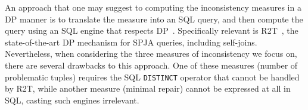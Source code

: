 


An approach that one may suggest to computing the inconsistency measures in a DP manner is to translate the measure into an SQL query, and then compute the query using an SQL engine that respects DP~\cite{tao2020computing,dong2022r2t,kotsogiannis2019privatesql,johnson2018towards}. Specifically relevant is R2T~\cite{dong2022r2t}, the state-of-the-art DP mechanism for SPJA queries, including self-joins. Nevertheless, when considering the three measures of inconsistency we focus on, there are several drawbacks to this approach. One of these measures (number of problematic tuples) requires the SQL {\tt DISTINCT} operator that cannot be handled by R2T, while another measure (minimal repair) cannot be expressed at all in SQL, casting such engines irrelevant. 

